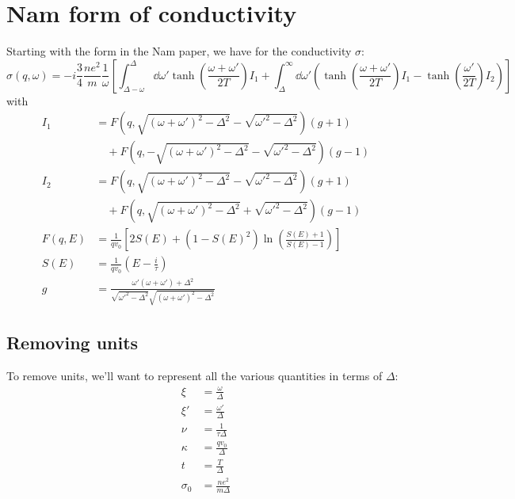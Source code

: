 \documentclass[../../main.tex]{subfiles}
\begin{document}
\section{Nam form of conductivity} \label{sec:NamForm}

Starting with the form in the Nam paper, we have for the conductivity $\sigma$:
\begin{equation}
\sigma(q, \omega) = -i \frac34\frac{ n e^2}{ m} \frac{1}{\omega}\left[\int_{\Delta - \omega}^{\Delta}\dd{\omega'} \tanh(\frac{\omega + \omega'}{2T}) I_1 + \int_{\Delta}^{\infty} \dd{\omega'} \left( \tanh(\frac{\omega + \omega'}{2T}) I_1  - \tanh(\frac{\omega'}{2T})I_2 \right) \right]
\end{equation}
with 
\begin{align}
I_1 &= F(q, \sqrt{(\omega + \omega')^2 - \Delta^2} - \sqrt{\omega'^2 - \Delta^2}) (g + 1) \nonumber\\
&\quad + F(q, -\sqrt{(\omega + \omega')^2 - \Delta^2} - \sqrt{\omega'^2 - \Delta^2}) (g - 1) \\
I_2 &= F(q, \sqrt{(\omega + \omega')^2 - \Delta^2} - \sqrt{\omega'^2 - \Delta^2}) (g + 1) \nonumber\\
&\quad + F(q, \sqrt{(\omega + \omega')^2 - \Delta^2} + \sqrt{\omega'^2 - \Delta^2}) (g - 1) \\	
F(q, E) &= \frac{1}{q v_0} \left[2S(E) + (1 - S(E)^2)\ln(\frac{S(E) + 1}{S(E) - 1})\right]  \\
S(E) &= \frac{1}{q v_0} \left(E - \frac{i}{\tau} \right) \\
g  &= \frac{\omega' \left( \omega + \omega'\right) + \Delta^2}{\sqrt{\omega'^2 - \Delta^2}\sqrt{(\omega + \omega')^2 - \Delta^2}}
\end{align}

\subsection{Removing units} \label{subsec:NamForm.Dimensionless}

To remove units, we'll want to represent all the various quantities in terms of $\Delta$:
\begin{align}
\xi &= \frac{\omega}{\Delta} \\
\xi' &= \frac{\omega'}{\Delta} \\
\nu &= \frac{1}{\tau \Delta} \\
\kappa &= \frac{q v_0}{\Delta} \\
t &= \frac{T}{\Delta} \\
\sigma_0 &= \frac{n e^2}{m \Delta}
\end{align}
\end{document}
